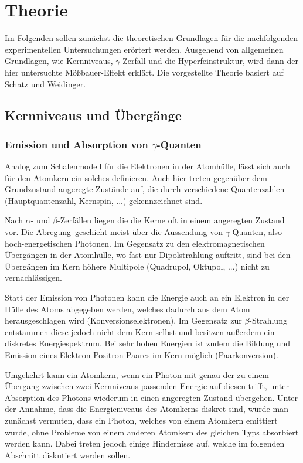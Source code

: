\section{Theorie}
	
	Im Folgenden sollen zunächst die theoretischen Grundlagen für die nachfolgenden experimentellen Untersuchungen erörtert werden. Ausgehend von allgemeinen Grundlagen, wie Kernniveaus, $\gamma$-Zerfall und die Hyperfeinstruktur, wird dann der hier untersuchte Mößbauer-Effekt erklärt. Die vorgestellte Theorie basiert auf Schatz und Weidinger.\cite{schatz}
	
	\subsection{Kernniveaus und Übergänge}
	
	\subsubsection{Emission und Absorption von $\gamma$-Quanten}
	
	Analog zum Schalenmodell für die Elektronen in der Atomhülle, lässt sich auch für den Atomkern ein solches definieren. Auch hier treten gegenüber dem Grundzustand angeregte Zustände auf, die durch verschiedene Quantenzahlen (Hauptquantenzahl, Kernspin, ...) gekennzeichnet sind.
	
	Nach $\alpha$- und $\beta$-Zerfällen liegen die die Kerne oft in einem angeregten Zustand vor. Die \glqq Abregung\grqq\ geschieht meist über die Aussendung von $\gamma$-Quanten, also hoch-energetischen Photonen. Im Gegensatz zu den elektromagnetischen Übergängen in der Atomhülle, wo fast nur Dipolstrahlung auftritt, sind bei den Übergängen im Kern höhere Multipole (Quadrupol, Oktupol, ...) nicht zu vernachlässigen. 
	
	\noindent Statt der Emission von Photonen kann die Energie auch an ein Elektron in der Hülle des Atoms abgegeben werden, welches dadurch aus dem Atom herausgeschlagen wird (Konversionselektronen). Im Gegensatz zur $\beta$-Strahlung entstammen diese jedoch nicht dem Kern selbst und besitzen außerdem ein diskretes Energiespektrum. Bei sehr hohen Energien ist zudem die Bildung und Emission eines Elektron-Positron-Paares im Kern möglich (Paarkonversion).
	
	Umgekehrt kann ein Atomkern, wenn ein Photon mit genau der zu einem Übergang zwischen zwei Kernniveaus passenden Energie auf diesen trifft, unter Absorption des Photons wiederum in einen angeregten Zustand übergehen. Unter der Annahme, dass die Energieniveaus des Atomkerns diskret sind, würde man zunächst vermuten, dass ein Photon, welches von einem Atomkern emittiert wurde, ohne Probleme von einem anderen Atomkern des gleichen Typs absorbiert werden kann. Dabei treten jedoch einige Hindernisse auf, welche im folgenden Abschnitt diskutiert werden sollen.
	
